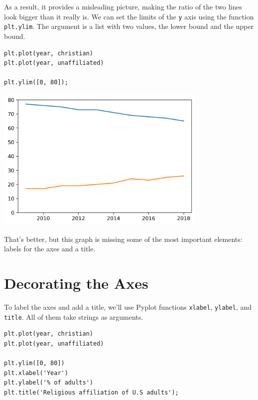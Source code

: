 As a result, it provides a misleading picture, making the ratio of the
two lines look bigger than it really is. We can set the limits of the
\passthrough{\lstinline!y!} axis using the function
\passthrough{\lstinline!plt.ylim!}. The argument is a list with two
values, the lower bound and the upper bound.

\begin{lstlisting}[]
plt.plot(year, christian)
plt.plot(year, unaffiliated)

plt.ylim([0, 80]);
\end{lstlisting}

\begin{center}
\includegraphics[width=4in]{chapters/06_plotting_files/06_plotting_28_0.png}
\end{center}

That's better, but this graph is missing some of the most important
elements: labels for the axes and a title.

\hypertarget{decorating-the-axes}{%
\section{Decorating the Axes}\label{decorating-the-axes}}

To label the axes and add a title, we'll use Pyplot functions
\passthrough{\lstinline!xlabel!}, \passthrough{\lstinline!ylabel!}, and
\passthrough{\lstinline!title!}. All of them take strings as arguments.

\begin{lstlisting}[]
plt.plot(year, christian)
plt.plot(year, unaffiliated)

plt.ylim([0, 80])
plt.xlabel('Year')
plt.ylabel('% of adults')
plt.title('Religious affiliation of U.S adults');
\end{lstlisting}

